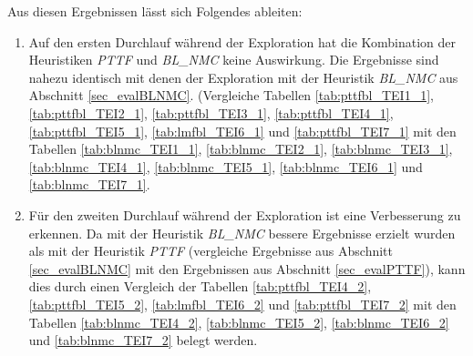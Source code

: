 \begin{multicols}{2}
\columnbreak
{}
\end{multicols}

\begin{multicols}{2}
\columnbreak
{}
\end{multicols}

\begin{multicols}{2}
\columnbreak
{}
\end{multicols}

\begin{multicols}{2}
\columnbreak
{}
\end{multicols}
\noindent
Aus diesen Ergebnissen lässt sich Folgendes ableiten:
\begin{enumerate}
\item Auf den ersten Durchlauf während der Exploration hat die Kombination der Heuristiken \emph{PTTF} und \emph{BL\_NMC} keine Auswirkung. Die Ergebnisse sind nahezu identisch mit denen der Exploration mit der Heuristik \emph{BL\_NMC} aus Abschnitt \ref{sec_evalBLNMC}. (Vergleiche Tabellen \ref{tab:pttfbl_TEI1_1}, \ref{tab:pttfbl_TEI2_1}, \ref{tab:pttfbl_TEI3_1}, \ref{tab:pttfbl_TEI4_1}, \ref{tab:pttfbl_TEI5_1}, \ref{tab:lmfbl_TEI6_1} und  \ref{tab:pttfbl_TEI7_1} mit den Tabellen \ref{tab:blnmc_TEI1_1}, \ref{tab:blnmc_TEI2_1}, \ref{tab:blnmc_TEI3_1}, \ref{tab:blnmc_TEI4_1}, \ref{tab:blnmc_TEI5_1}, \ref{tab:blnmc_TEI6_1} und \ref{tab:blnmc_TEI7_1}.
\item Für den zweiten Durchlauf während der Exploration ist eine Verbesserung  zu erkennen. Da mit der Heuristik \emph{BL\_NMC} bessere Ergebnisse erzielt wurden als mit der Heuristik \emph{PTTF} (vergleiche Ergebnisse aus Abschnitt \ref{sec_evalBLNMC} mit den Ergebnissen aus Abschnitt \ref{sec_evalPTTF}), kann dies durch einen Vergleich der Tabellen \ref{tab:pttfbl_TEI4_2}, \ref{tab:pttfbl_TEI5_2}, \ref{tab:lmfbl_TEI6_2} und  \ref{tab:pttfbl_TEI7_2} mit den Tabellen \ref{tab:blnmc_TEI4_2}, \ref{tab:blnmc_TEI5_2}, \ref{tab:blnmc_TEI6_2} und \ref{tab:blnmc_TEI7_2} belegt werden.
\end{enumerate}


